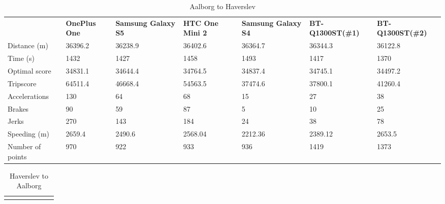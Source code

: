 \begin{landscape}
\begin{table*}[h]
\hspace{-2.5in}
\begin{minipage}{0.95\textwidth}
\caption{Aalborg to Haverslev}
\label{exp2trip1}
\begin{tabular}{|l|llllll|}
\hline
\rowcolor{tablegreen}

                 & \textbf{OnePlus One} & \textbf{Samsung Galaxy S5} & \textbf{HTC One Mini 2} & \textbf{Samsung Galaxy S4} & \textbf{BT-Q1300ST(\#1)} & \textbf{BT-Q1300ST(\#2)} \\
Distance (m)     & 36396.2     & 36238.9           & 36402.6        & 36364.7           & 36344.3         & 36122.8         \\
Time (s)         & 1432        & 1427              & 1458           & 1493              & 1417            & 1370            \\
Optimal score    & 34831.1     & 34644.4           & 34764.5        & 34837.4           & 34745.1         & 34497.2         \\
Tripscore        & 64511.4     & 46668.4           & 54563.5        & 37474.6           & 37800.1         & 41260.4         \\
Accelerations    & 130         & 64                & 68             & 15                & 27              & 38              \\
Brakes           & 90          & 59                & 87             & 5                 & 10              & 25              \\
Jerks            & 270         & 143               & 184            & 24                & 38              & 78              \\
Speeding (m)     & 2659.4      & 2490.6            & 2568.04        & 2212.36           & 2389.12         & 2653.5          \\
Number of points & 970         & 922               & 933            & 936               & 1419            & 1373            \\\hline           
\end{tabular}
\end{minipage}
\end{table*}
\vspace{10 mm}
\begin{table*}[h]
\hspace{-2.5in}
\begin{minipage}{0.95\textwidth}
\caption{Haverslev to Aalborg}
\label{exp2trip2}
\begin{tabular}{|l|llllll|}
\hline
\rowcolor{tablegreen}


\end{tabular}
\end{minipage}
\end{table*}
\end{landscape}
